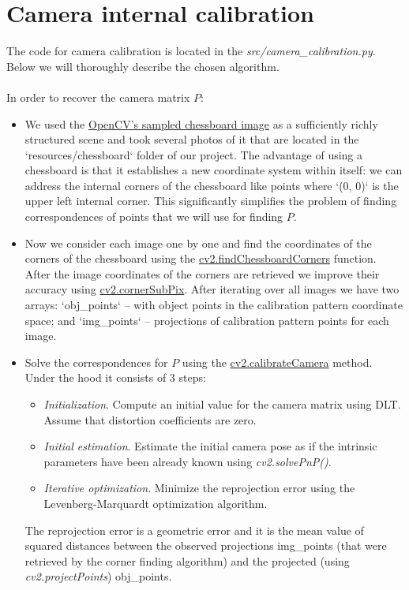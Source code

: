 \documentclass[paper=a4, fontsize=11pt]{scrartcl}
\numberwithin{equation}{section}		%
\numberwithin{figure}{section}			%
\numberwithin{table}{section}				%
\begin{document}
\section*{Camera internal calibration}
The code for camera calibration is located in the \emph{src/camera\_calibration.py}. Below we will thoroughly describe the chosen algorithm.\\\\In order to recover the camera matrix $P$:
\begin{itemize}
\item We used the \href{https://github.com/opencv/opencv/blob/master/samples/data/chessboard.png}{OpenCV's sampled chessboard image} as a sufficiently richly structured scene and took several photos of it that are located in the `resources/chessboard` folder of our project. The advantage of using a chessboard is that it establishes a new coordinate system within itself: we can address the internal corners of the chessboard like points where `(0, 0)` is the upper left internal corner. This significantly simplifies the problem of finding correspondences of points that we will use for finding $P$.
\item Now we consider each image one by one and find the coordinates of the corners of the chessboard using the \href{https://docs.opencv.org/2.4/modules/calib3d/doc/camera_calibration_and_3d_reconstruction.html#findchessboardcorners}{cv2.findChessboardCorners} function. After the image coordinates of the corners are retrieved we improve their accuracy using \href{https://docs.opencv.org/2.4/modules/imgproc/doc/feature_detection.html#cv2.cornerSubPix}{cv2.cornerSubPix}. After iterating over all images we have two arrays: `obj\_points` -- with object points in the calibration pattern coordinate space; and `img\_points` -- projections of calibration pattern points for each image.
\item Solve the correspondences for $P$ using the \href{https://docs.opencv.org/2.4/modules/calib3d/doc/camera_calibration_and_3d_reconstruction.html#cv2.calibrateCamera}{cv2.calibrateCamera} method. Under the hood it consists of 3 steps:
\begin{itemize}
\item \emph{Initialization}. Compute an initial value for the camera matrix using DLT. Assume that distortion coefficients are zero.
\item \emph{Initial estimation}. Estimate the initial camera pose as if the intrinsic parameters have been already known using \emph{cv2.solvePnP()}.
\item \emph{Iterative optimization}. Minimize the reprojection error using the Levenberg-Marquardt optimization algorithm.
\end{itemize}
The reprojection error is a geometric error and it is the mean value of squared distances between the observed projections img\_points (that were retrieved by the corner finding algorithm) and the projected (using \emph{cv2.projectPoints}) obj\_points.
\end{itemize}
\end{document}
